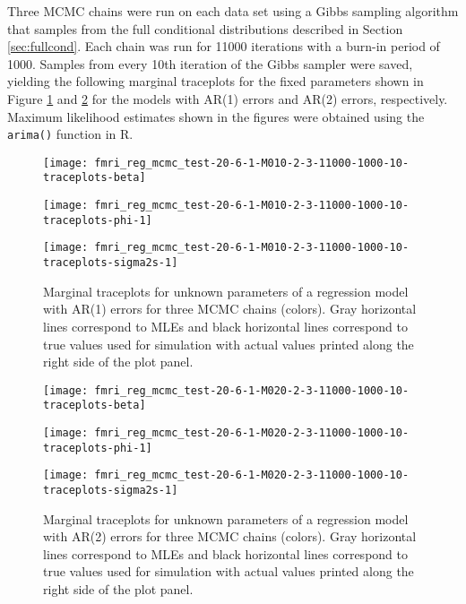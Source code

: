 \documentclass{article}
\begin{document}
Three MCMC chains were run on each data set using a Gibbs sampling algorithm that samples from the full conditional distributions described in Section \ref{sec:fullcond}. Each chain was run for 11000 iterations with a burn-in period of 1000. Samples from every 10th iteration of the Gibbs sampler were saved, yielding the following marginal traceplots for the fixed parameters shown in Figure \ref{fig:tracetheta1} and \ref{fig:tracetheta2} for the models with AR(1) errors and AR(2) errors, respectively. Maximum likelihood estimates shown in the figures were obtained using the {\tt arima()} function in R.

\begin{figure}[ht]
\begin{minipage}{0.5\linewidth}
\texttt{[image: fmri\_reg\_mcmc\_test-20-6-1-M010-2-3-11000-1000-10-traceplots-beta]}
\end{minipage}
\begin{minipage}{0.5\linewidth}
\texttt{[image: fmri\_reg\_mcmc\_test-20-6-1-M010-2-3-11000-1000-10-traceplots-phi-1]}
\end{minipage}
\begin{minipage}{0.5\linewidth}
\texttt{[image: fmri\_reg\_mcmc\_test-20-6-1-M010-2-3-11000-1000-10-traceplots-sigma2s-1]}
\end{minipage}
\caption{Marginal traceplots for unknown parameters of a regression model with AR(1) errors for three MCMC chains (colors). Gray horizontal lines correspond to MLEs and black horizontal lines correspond to true values used for simulation with actual values printed along the right side of the plot panel.} \label{fig:tracetheta1}
\end{figure}

\begin{figure}[ht]
\begin{minipage}{0.5\linewidth}
\texttt{[image: fmri\_reg\_mcmc\_test-20-6-1-M020-2-3-11000-1000-10-traceplots-beta]}
\end{minipage}
\begin{minipage}{0.5\linewidth}
\texttt{[image: fmri\_reg\_mcmc\_test-20-6-1-M020-2-3-11000-1000-10-traceplots-phi-1]}
\end{minipage}
\begin{minipage}{0.5\linewidth}
\texttt{[image: fmri\_reg\_mcmc\_test-20-6-1-M020-2-3-11000-1000-10-traceplots-sigma2s-1]}
\end{minipage}
\caption{Marginal traceplots for unknown parameters of a regression model with AR(2) errors for three MCMC chains (colors). Gray horizontal lines correspond to MLEs and black horizontal lines correspond to true values used for simulation with actual values printed along the right side of the plot panel.} \label{fig:tracetheta2}
\end{figure}
\end{document}
